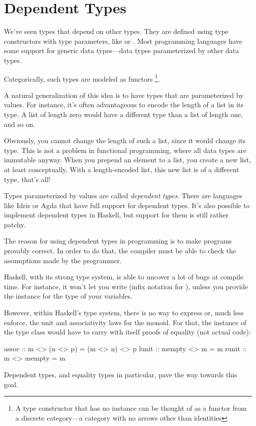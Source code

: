 \documentclass[DaoFP]{subfiles}
\begin{document}
\setcounter{chapter}{10}

\chapter{Dependent Types}

We've seen types that depend on other types. They are defined using type constructors with type parameters, like  or \hask{[]}. Most programming languages have some support for generic data types---data types parameterized by other data types.

Categorically, such types are modeled as functors \footnote{A type constructor that has no  instance can be thought of as a functor from a discrete category---a category with no arrows other than identities}.

A natural generalization of this idea is to have types that are parameterized by values. For instance, it's often advantageous to encode the length of a list in its type. A list of length zero would have a different type than a list of length one, and so on. 

Obviously, you cannot change the length of such a list, since it would change its type. This is not a problem in functional programming, where all data types are immutable anyway. When you prepend an element to a list, you create a new list, at least conceptually. With a length-encoded list, this new list is of a different type, that's all!

Types parameterized by values are called \emph{dependent types}. There are languages like Idris or Agda that have full support for dependent types. It's also possible to implement dependent types in Haskell, but support for them is still rather patchy. 

The reason for using dependent types in programming is to make programs provably correct. In order to do that, the compiler must be able to check the assumptions made by the programmer. 

Haskell, with its strong type system, is able to uncover a lot of bugs at compile time. For instance, it won't let you write  (infix notation for ), unless you provide the  instance for the type of your variables. 

However, within Haskell's type system, there is no way to express or, much less enforce, the unit and associativity laws for the monoid. For that, the instance of the  type class would have to carry with itself proofs of equality (not actual code):
\begin{haskell}
assoc :: m <> (n <> p) = (m <> n) <> p
lunit :: mempty <> m = m
runit :: m <> mempty = m
\end{haskell}
Dependent types, and equality types in particular, pave the way towards this goal.
\end{document}
